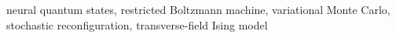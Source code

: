 neural quantum states, restricted Boltzmann machine, variational Monte Carlo, stochastic reconfiguration, transverse-field Ising model
